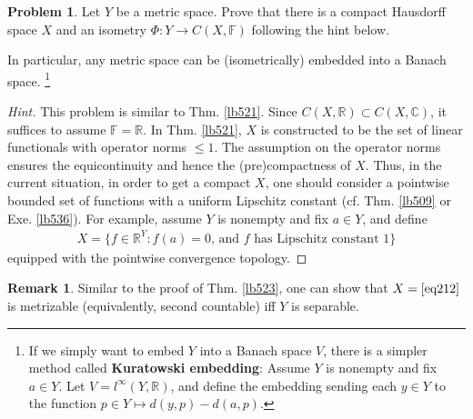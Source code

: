 \documentclass[12pt,b5paper,notitlepage]{article}
\theoremstyle{definition}
\newtheorem{rem}[df]{Remark}
\newtheorem{prob}{\color{red}Problem}[section]
\theoremstyle{plain}
\newcommand{\Cbb}{\mathbb C}
\newcommand{\Rbb}{\mathbb R}
\newcommand{\Fbb}{\mathbb F}
\numberwithin{equation}{section}
\begin{document}
\begin{prob}\label{lb537}
Let $Y$ be a metric space. Prove that there is a compact Hausdorff space $X$ and an isometry $\Phi:Y\rightarrow C(X,\Fbb)$ following the hint below. 
\end{prob}

In particular, any metric space can be (isometrically) embedded into a Banach space. \footnote{If we simply want to embed $Y$ into a Banach space $V$, there is a simpler method called \textbf{Kuratowski embedding}: Assume $Y$ is nonempty and fix $a\in Y$. Let $V=l^\infty(Y,\Rbb)$, and define the embedding sending each $y\in Y$ to the function $p\in Y\mapsto d(y,p)-d(a,p)$.}

\begin{proof}[Hint]
This problem is similar to Thm. \ref{lb521}. Since $C(X,\Rbb)\subset C(X,\Cbb)$, it suffices to assume $\Fbb=\Rbb$. In  Thm. \ref{lb521}, $X$ is constructed to be the set of linear functionals with operator norms $\leq 1$. The assumption on the operator norms ensures the equicontinuity and hence the (pre)compactness of $X$. Thus, in the current situation, in order to get a compact $X$, one should consider a pointwise bounded set of functions with a uniform Lipschitz constant  (cf. Thm. \ref{lb509} or Exe. \ref{lb536}). For example, assume $Y$ is nonempty and fix $a\in Y$, and define
\begin{align}\label{eq212}
X=\{f\in \Rbb^Y:f(a)=0\text{, and $f$ has Lipschitz constant }1\}
\end{align}
equipped with the pointwise convergence topology.
\end{proof}


\begin{rem}
Similar to the proof of Thm. \ref{lb523}, one can show that $X=\eqref{eq212}$ is metrizable (equivalently, second countable) iff $Y$ is separable.
\end{rem}
\end{document}
